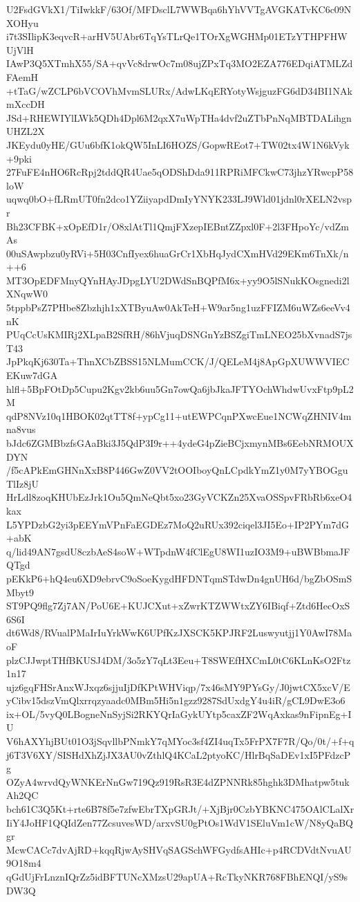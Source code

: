 U2FsdGVkX1/TiIwkkF/63Of/MFDsclL7WWBqa6hYhVVTgAVGKATvKC6c09NXOHyu
i7t3SIlipK3eqvcR+arHV5UAbr6TqYsTLrQe1TOrXgWGHMp01ETzYTHPFHWUjVlH
IAwP3Q5XTmhX55/SA+qvVc8drwOc7m08ujZPxTq3MO2EZA776EDqiATMLZdFAemH
+tTaG/wZCLP6bVCOVhMvmSLURx/AdwLKqERYotyWsjguzFG6dD34BI1NAkmXccDH
JSd+RHEWIYlLWk5QDh4Dpl6M2qxX7uWpTHa4dvf2uZTbPnNqMBTDALihgnUHZL2X
JKEydu0yHE/GUu6bfK1okQW5InLI6HOZS/GopwREot7+TW02tx4W1N6kVyk+9pki
27FuFE4nHO6RcRpj2tddQR4Uae5qODShDda911RPRiMFCkwC73jhzYRwcpP58loW
uqwq0bO+fLRmUT0fn2dco1YZiiyapdDmIyYNYK233LJ9Wld01jdnl0rXELN2vspr
Bh23CFBK+xOpEfD1r/O8xlAtTl1QmjFXzepIEBntZZpxl0F+2l3FHpoYc/vdZmAs
00uSAwpbzu0yRVi+5H03CnfIyex6huaGrCr1XbHqJydCXmHVd29EKm6TnXk/n++6
MT3OpEDFMnyQYnHAyJDpgLYU2DWdSnBQPfM6x+yy9O5lSNukKOsgnedi2lXNqwW0
5tppbPsZ7PHbe8Zbzhjh1xXTByuAw0AkTeH+W9ar5ng1uzFFIZM6uWZs6eeVv4nK
PUqCcUsKMIRj2XLpaB2SfRH/86hVjuqDSNGnYzBSZgiTmLNEO25bXvnadS7jsT43
JpPkqKj630Ta+ThnXCbZBSS15NLMumCCK/J/QELeM4j8ApGpXUWWVIECEKuw7dGA
hlfl+5BpFOtDp5Cupu2Kgv2kb6uu5Gn7owQa6jbJkaJFTYOchWhdwUvxFtp9pL2M
qdP8NVz10q1HBOK02qtTT8f+ypCg11+utEWPCqnPXwcEue1NCWqZHNIV4mna8vus
bJdc6ZGMBbzfsGAaBki3J5QdP3I9r++4ydeG4pZieBCjxmynMBs6EebNRMOUXDYN
/f5cAPkEmGHNnXxB8P446GwZ0VV2tOOIboyQnLCpdkYmZ1y0M7yYBOGguTlIz8jU
HrLdl8zoqKHUbEzJrk1Ou5QmNeQbt5xo23GyVCKZn25XvaOSSpvFRbRb6xeO4kax
L5YPDzbG2yi3pEEYmVPnFaEGDEz7MoQ2uRUx392ciqel3JI5Eo+IP2PYm7dG+abK
q/lid49AN7gsdU8czbAeS4soW+WTpdnW4fClEgU8WI1uzIO3M9+uBWBbmaJFQTgd
pEKkP6+hQ4eu6XD9ebrvC9oSoeKygdHFDNTqmSTdwDn4gnUH6d/bgZbOSmSMbyt9
ST9PQ9flg7Zj7AN/PoU6E+KUJCXut+xZwrKTZWWtxZY6IBiqf+Ztd6HecOxS6S6I
dt6Wd8/RVualPMaIrIuYrkWwK6UPfKzJXSCK5KPJRF2Luswyutjj1Y0AwI78MaoF
plzCJJwptTHfBKUSJ4DM/3o5zY7qLt3Eeu+T8SWEfHXCmL0tC6KLnKsO2Ftz1n17
ujz6gqFHSrAnxWJxqz6sjjuIjDfKPtWHViqp/7x46sMY9PYsGy/J0jwtCX5xcV/E
yCibv15dszVmQlxrrqzyaadc0MBm5Hi5n1gzz9287SdUxdgY4u4iR/gCL9DwE3o6
ix+OL/5vyQ0LBogneNnSyjSi2RKYQrIaGykUYtp5caxZF2WqAxkas9nFipnEg+IU
V6hAXYhjBUt01O3jSqvllbPNmkY7qMYoc3sf4ZI4uqTx5FrPX7F7R/Qo/0t/+f+q
j6T3V6XY/SISHdXhZjJX3AU0vZthlQ4KCaL2ptyoKC/HlrBqSaDEv1xI5PFdzcPg
OZyA4wrvdQyWNKErNnGw719Qz919RsR3E4dZPNNRk85hghk3DMhatpw5tukAh2QC
bch61C3Q5Kt+rte6B78f5e7zfwEbrTXpGRJt/+XjBjr0CzbYBKNC475OAlCLalXr
IiY4JoHF1QQIdZen77ZcsuvesWD/arxvSU0gPtOs1WdV1SEluVm1cW/N8yQaBQgr
McwCACc7dvAjRD+kqqRjwAySHVqSAGSchWFGydfsAHIc+p4RCDVdtNvuAU9O18m4
qGdUjFrLnznIQrZz5idBFTUNcXMzsU29apUA+RcTkyNKR768FBhENQI/yS9sDW3Q
